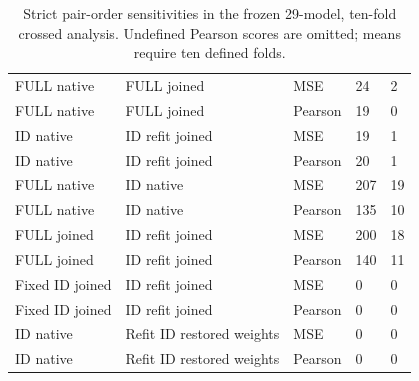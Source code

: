 \begin{table}[t]
\centering\small{}\setlength{\tabcolsep}{3.5pt}
\caption{Strict pair-order sensitivities in the frozen 29-model, ten-fold crossed analysis. Undefined Pearson scores are omitted; means require ten defined folds.}
\label{tab:crossedmeasure}
\begin{tabularx}{\textwidth}{@{}L{0.25\textwidth}XL{0.13\textwidth}N{0.1\textwidth}N{0.11\textwidth}@{}}
\toprule
{} &  &  &  & \\\midrule
FULL native & FULL joined & MSE & 24 & 2\\
FULL native & FULL joined & Pearson & 19 & 0\\
ID native & ID refit joined & MSE & 19 & 1\\
ID native & ID refit joined & Pearson & 20 & 1\\
FULL native & ID native & MSE & 207 & 19\\
FULL native & ID native & Pearson & 135 & 10\\
FULL joined & ID refit joined & MSE & 200 & 18\\
FULL joined & ID refit joined & Pearson & 140 & 11\\
Fixed ID joined & ID refit joined & MSE & 0 & 0\\
Fixed ID joined & ID refit joined & Pearson & 0 & 0\\
ID native & Refit ID restored weights & MSE & 0 & 0\\
ID native & Refit ID restored weights & Pearson & 0 & 0\\
\bottomrule
\end{tabularx}
\end{table}

